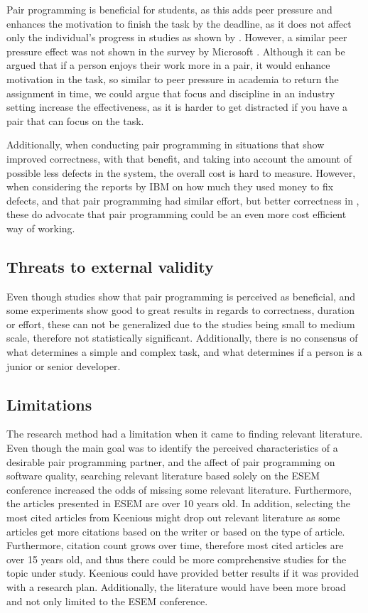 \documentclass[conference]{IEEEtran}
\begin{document}
Pair programming is beneficial for students, as this adds peer pressure and enhances the motivation to finish the task by the deadline, as it does not affect only the individual's progress in studies as shown by \cite{Williams2000Strengthening}. However, a similar peer pressure effect was not shown in the survey by Microsoft \cite{10.1145/1414004.1414026}. Although it can be argued that if a person enjoys their work more in a pair, it would enhance motivation in the task, so similar to peer pressure in academia to return the assignment in time, we could argue that focus and discipline in an industry setting increase the effectiveness, as it is harder to get distracted if you have a pair that can focus on the task.

Additionally, when conducting pair programming in situations that show improved correctness, with that benefit, and taking into account the amount of possible less defects in the system, the overall cost is hard to measure. However, when considering the reports by IBM \cite{10.5555/377517.377531} on how much they used money to fix defects, and that pair programming had similar effort, but better correctness in \cite{10.1145/1159733.1159749}, these do advocate that pair programming could be an even more cost efficient way of working.

\subsection{Threats to external validity}

Even though studies show that pair programming is perceived as beneficial, and some experiments show good to great results in regards to correctness, duration or effort, these can not be generalized due to the studies being small to medium scale, therefore not statistically significant. Additionally, there is no consensus of what determines a simple and complex task, and what determines if a person is a junior or senior developer.

\subsection{Limitations}

The research method had a limitation when it came to finding relevant literature. Even though the main goal was to identify the perceived characteristics of a desirable pair programming partner, and the affect of pair programming on software quality, searching relevant literature based solely on the ESEM conference increased the odds of missing some relevant literature. Furthermore, the articles presented in ESEM are over 10 years old. In addition, selecting the most cited articles from Keenious might drop out relevant literature as some articles get more citations based on the writer or based on the type of article. Furthermore, citation count grows over time, therefore most cited articles are over 15 years old, and thus there could be more comprehensive studies for the topic under study. Keenious could have provided better results if it was provided with a research plan. Additionally, the literature would have been more broad and not only limited to the ESEM conference.
\end{document}
